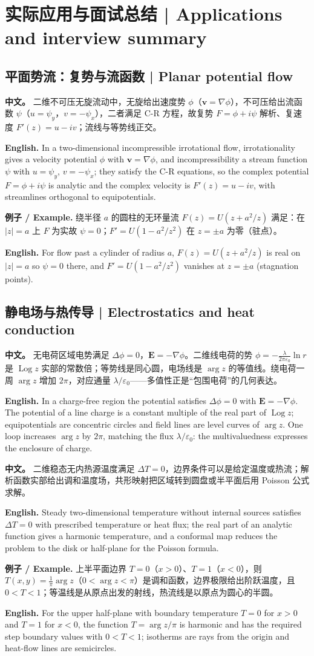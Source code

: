 \documentclass[UTF8,11pt,a4paper]{ctexart}
\newcommand{\EN}[1]{\par\noindent \textbf{English.} #1\par}
\newcommand{\EX}[2]{\par\noindent \textbf{例子 / Example.} #1\par\EN{#2}}
\newcommand{\APS}[2]{\par\noindent\textbf{中文。} #1\par\noindent\textbf{English.} #2\par\smallskip}
\begin{document}
\section*{实际应用与面试总结 | Applications and interview summary}

\subsection*{平面势流：复势与流函数 | Planar potential flow}
\APS{二维不可压无旋流动中，无旋给出速度势 $\phi$（$\mathbf v=\nabla\phi$），不可压给出流函数 $\psi$（$u=\psi_y$，$v=-\psi_x$），二者满足 C-R 方程，故复势 $F=\phi+i\psi$ 解析、复速度 $F'(z)=u-iv$；流线与等势线正交。}{In a two-dimensional incompressible irrotational flow, irrotationality gives a velocity potential $\phi$ with $\mathbf v=\nabla\phi$, and incompressibility a stream function $\psi$ with $u=\psi_y$, $v=-\psi_x$; they satisfy the C-R equations, so the complex potential $F=\phi+i\psi$ is analytic and the complex velocity is $F'(z)=u-iv$, with streamlines orthogonal to equipotentials.}
\EX{绕半径 $a$ 的圆柱的无环量流 $F(z)=U(z+a^2/z)$ 满足：在 $|z|=a$ 上 $F$ 为实故 $\psi=0$；$F'=U(1-a^2/z^2)$ 在 $z=\pm a$ 为零（驻点）。}{For flow past a cylinder of radius $a$, $F(z)=U(z+a^2/z)$ is real on $|z|=a$ so $\psi=0$ there, and $F'=U(1-a^2/z^2)$ vanishes at $z=\pm a$ (stagnation points).}

\subsection*{静电场与热传导 | Electrostatics and heat conduction}
\APS{无电荷区域电势满足 $\Delta\phi=0$，$\mathbf E=-\nabla\phi$。二维线电荷的势 $\phi=-\frac{\lambda}{2\pi\varepsilon_0}\ln r$ 是 $\operatorname{Log}z$ 实部的常数倍；等势线是同心圆，电场线是 $\arg z$ 的等值线。绕电荷一周 $\arg z$ 增加 $2\pi$，对应通量 $\lambda/\varepsilon_0$——多值性正是“包围电荷”的几何表达。}{In a charge-free region the potential satisfies $\Delta\phi=0$ with $\mathbf E=-\nabla\phi$. The potential of a line charge is a constant multiple of the real part of $\operatorname{Log}z$; equipotentials are concentric circles and field lines are level curves of $\arg z$. One loop increases $\arg z$ by $2\pi$, matching the flux $\lambda/\varepsilon_0$: the multivaluedness expresses the enclosure of charge.}
\APS{二维稳态无内热源温度满足 $\Delta T=0$，边界条件可以是给定温度或热流；解析函数实部给出调和温度场，共形映射把区域转到圆盘或半平面后用 Poisson 公式求解。}{Steady two-dimensional temperature without internal sources satisfies $\Delta T=0$ with prescribed temperature or heat flux; the real part of an analytic function gives a harmonic temperature, and a conformal map reduces the problem to the disk or half-plane for the Poisson formula.}
\EX{上半平面边界 $T=0$（$x>0$）、$T=1$（$x<0$），则 $T(x,y)=\frac1\pi\arg z$（$0<\arg z<\pi$）是调和函数，边界极限给出阶跃温度，且 $0<T<1$；等温线是从原点出发的射线，热流线是以原点为圆心的半圆。}{For the upper half-plane with boundary temperature $T=0$ for $x>0$ and $T=1$ for $x<0$, the function $T=\arg z/\pi$ is harmonic and has the required step boundary values with $0<T<1$; isotherms are rays from the origin and heat-flow lines are semicircles.}
\end{document}
